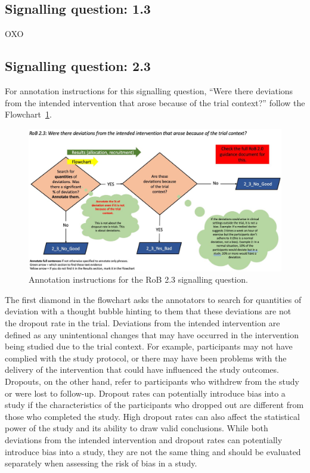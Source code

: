 \documentclass[sn-mathphys,Numbered]{sn-jnl}%
\begin{document}
\subsection{Signalling question: 1.3}
%
OXO
%
%
%
\subsection{Signalling question: 2.3}
%
For annotation instructions for this signalling question, ``Were there deviations from the intended intervention that arose because of the trial context?'' follow the Flowchart~\ref{fig:2_3}.
%
\begin{figure}[hbt]
    \centering
    \includegraphics[width=\textwidth]{figures/2_3.jpg}
    \caption{Annotation instructions for the RoB 2.3 signalling question.}
    \label{fig:2_3}
\end{figure}
%
The first diamond in the flowchart asks the annotators to search for quantities of deviation with a thought bubble hinting to them that these deviations are not the dropout rate in the trial.
Deviations from the intended intervention are defined as any unintentional changes that may have occurred in the intervention being studied due to the trial context. 
For example, participants may not have complied with the study protocol, or there may have been problems with the delivery of the intervention that could have influenced the study outcomes.
Dropouts, on the other hand, refer to participants who withdrew from the study or were lost to follow-up.
Dropout rates can potentially introduce bias into a study if the characteristics of the participants who dropped out are different from those who completed the study.
High dropout rates can also affect the statistical power of the study and its ability to draw valid conclusions.
While both deviations from the intended intervention and dropout rates can potentially introduce bias into a study, they are not the same thing and should be evaluated separately when assessing the risk of bias in a study.
\end{document}
